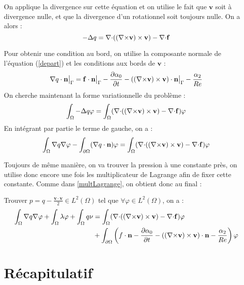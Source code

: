 On applique la divergence sur cette équation et on utilise le fait que $\mathbf{v}$ soit à divergence nulle, et que la divergence d'un rotationnel soit toujours nulle. On a alors :
\begin{equation*}
-{\Delta} q = {\nabla\cdot}(({\nabla\times} \mathbf{v})\times \mathbf{v}) - {\nabla\cdot} \mathbf{f}
\end{equation*}

Pour obtenir une condition au bord, on utilise la composante normale de l'équation (\ref{depart}) et les conditions aux bords de $\mathbf{v}$ :
\[ {\nabla} q\cdot \mathbf{n}{\big\rvert_{\Gamma}} =  \mathbf{f}\cdot \mathbf{n}{\big\rvert_{\Gamma}} - \frac{\partial\alpha_0}{\partial t} - (({\nabla\times} \mathbf{v})\times \mathbf{v})\cdot \mathbf{n}{\big\rvert_{\Gamma}} - \frac{\alpha_2}{Re} \]
On cherche maintenant la forme variationnelle du problème :
\[ \int_\Omega -{\Delta} q\varphi = \int_\Omega ({\nabla\cdot}(({\nabla\times} \mathbf{v})\times \mathbf{v}) -{\nabla\cdot} \mathbf{f})\varphi \]
En intégrant par partie le terme de gauche, on a :
\[ \int_\Omega {\nabla} q{\nabla}\varphi - \int_{\partial\Omega} ({\nabla} q\cdot \mathbf{n})\varphi = \int_\Omega ({\nabla\cdot}(({\nabla\times} \mathbf{v})\times \mathbf{v}) -{\nabla\cdot} \mathbf{f})\varphi \]

Toujours de même manière, on va trouver la pression à une constante près, on utilise donc encore une fois les multiplicateur de Lagrange afin de fixer cette constante. Comme dans \ref{multLagrange}, on obtient donc au final :
\begin{pb}\label{fvq}
Trouver $p=q-\frac{\mathbf{v}\cdot\mathbf{v}}{2} \in L^2(\Omega)$ tel que $\forall \varphi\in L^2(\Omega)$, on a :
\begin{align*}
\int_\Omega {\nabla} q{\nabla}\varphi + \int_\Omega \lambda\varphi + \int_\Omega q\nu &= \int_\Omega ({\nabla\cdot}(({\nabla\times} \mathbf{v})\times \mathbf{v}) -{\nabla\cdot} \mathbf{f})\varphi\\
&+ \int_{\partial\Omega} \left(f\cdot \mathbf{n} - \frac{\partial\alpha_0}{\partial t} - (({\nabla\times} \mathbf{v})\times \mathbf{v})\cdot \mathbf{n} - \frac{\alpha_2}{Re}\right)\varphi
\end{align*}\end{pb}

\chapter{Récapitulatif}

